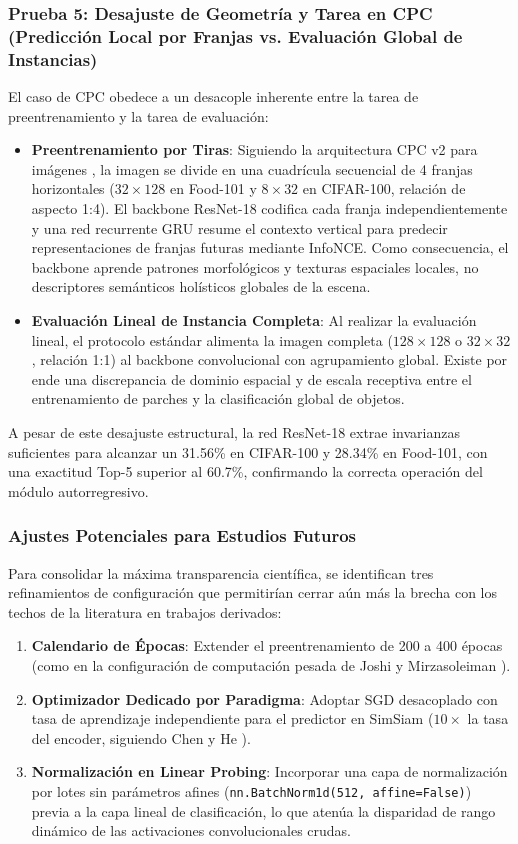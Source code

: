 \subsubsection{Prueba 5: Desajuste de Geometría y Tarea en CPC (Predicción Local por Franjas vs. Evaluación Global de Instancias)}
El caso de CPC obedece a un desacople inherente entre la tarea de preentrenamiento y la tarea de evaluación:
\begin{itemize}
    \item \textbf{Preentrenamiento por Tiras}: Siguiendo la arquitectura CPC v2 para imágenes \cite{oord2018cpc, henaff2019data}, la imagen se divide en una cuadrícula secuencial de 4 franjas horizontales ($32 \times 128$ en Food-101 y $8 \times 32$ en CIFAR-100, relación de aspecto 1:4). El backbone ResNet-18 codifica cada franja independientemente y una red recurrente GRU resume el contexto vertical para predecir representaciones de franjas futuras mediante InfoNCE. Como consecuencia, el backbone aprende patrones morfológicos y texturas espaciales locales, no descriptores semánticos holísticos globales de la escena.
    \item \textbf{Evaluación Lineal de Instancia Completa}: Al realizar la evaluación lineal, el protocolo estándar alimenta la imagen completa ($128 \times 128$ o $32 \times 32$, relación 1:1) al backbone convolucional con agrupamiento global. Existe por ende una discrepancia de dominio espacial y de escala receptiva entre el entrenamiento de parches y la clasificación global de objetos. 
\end{itemize}
A pesar de este desajuste estructural, la red ResNet-18 extrae invarianzas suficientes para alcanzar un 31.56\% en CIFAR-100 y 28.34\% en Food-101, con una exactitud Top-5 superior al 60.7\%, confirmando la correcta operación del módulo autorregresivo.

\subsubsection{Ajustes Potenciales para Estudios Futuros}
Para consolidar la máxima transparencia científica, se identifican tres refinamientos de configuración que permitirían cerrar aún más la brecha con los techos de la literatura en trabajos derivados:
\begin{enumerate}
    \item \textbf{Calendario de Épocas}: Extender el preentrenamiento de 200 a 400 épocas (como en la configuración de computación pesada de Joshi y Mirzasoleiman \cite{joshi2023sas}).
    \item \textbf{Optimizador Dedicado por Paradigma}: Adoptar SGD desacoplado con tasa de aprendizaje independiente para el predictor en SimSiam ($10\times$ la tasa del encoder, siguiendo Chen y He \cite{chen2021simsiam}).
    \item \textbf{Normalización en Linear Probing}: Incorporar una capa de normalización por lotes sin parámetros afines (\texttt{nn.BatchNorm1d(512, affine=False)}) previa a la capa lineal de clasificación, lo que atenúa la disparidad de rango dinámico de las activaciones convolucionales crudas.
\end{enumerate}

